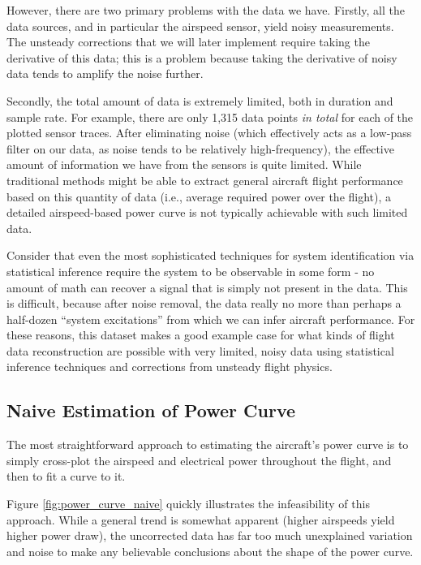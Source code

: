 However, there are two primary problems with the data we have. Firstly, all the data sources, and in particular the airspeed sensor, yield noisy measurements. The unsteady corrections that we will later implement require taking the derivative of this data; this is a problem because taking the derivative of noisy data tends to amplify the noise further.

Secondly, the total amount of data is extremely limited, both in duration and sample rate. For example, there are only 1,315 data points \emph{in total} for each of the plotted sensor traces. After eliminating noise (which effectively acts as a low-pass filter on our data, as noise tends to be relatively high-frequency), the effective amount of information we have from the sensors is quite limited. While traditional methods might be able to extract general aircraft flight performance based on this quantity of data (i.e., average required power over the flight), a detailed airspeed-based power curve is not typically achievable with such limited data.

Consider that even the most sophisticated techniques for system identification via statistical inference require the system to be observable in some form - no amount of math can recover a signal that is simply not present in the data. This is difficult, because after noise removal, the data really no more than perhaps a half-dozen ``system excitations'' from which we can infer aircraft performance. For these reasons, this dataset makes a good example case for what kinds of flight data reconstruction are possible with very limited, noisy data using statistical inference techniques and corrections from unsteady flight physics.

\subsection{Naive Estimation of Power Curve}

The most straightforward approach to estimating the aircraft's power curve is to simply cross-plot the airspeed and electrical power throughout the flight, and then to fit a curve to it.

Figure \ref{fig:power_curve_naive} quickly illustrates the infeasibility of this approach. While a general trend is somewhat apparent (higher airspeeds yield higher power draw), the uncorrected data has far too much unexplained variation and noise to make any believable conclusions about the shape of the power curve.


